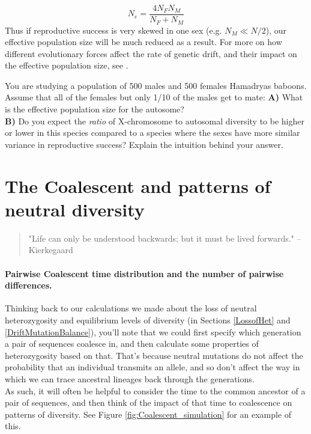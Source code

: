 \begin{equation}
N_e = \frac{4N_FN_M}{N_F+N_M}
\end{equation}
Thus if reproductive success is very skewed in one sex (e.g. $N_M \ll
N/2$), our effective population size will be much reduced as a result. For more on how different evolutionary forces affect the rate of genetic drift, and their impact on the effective population size, see \citet{charlesworth:09}.\\

\begin{question}
You are studying a population of 500 males and 500 females Hamadryas baboons. Assume that all of the females but only 1/10 of the males get to mate: 
{\bf A)} What is the effective population size for the autosome?\\
{\bf B)} Do you expect the {\it ratio} of X-chromosome to autosomal diversity to be higher or lower in this species compared to a species where the sexes have more similar variance in reproductive success? Explain the intuition behind your answer.
 \end{question}

\section{The Coalescent and patterns of neutral diversity}

\begin{quote}
"Life can only be understood backwards; but it must be lived
forwards." -- Kierkegaard
\end{quote}

\paragraph{Pairwise Coalescent time distribution and the number of
 pairwise differences.}
Thinking back to our calculations we made about the loss of neutral heterozygosity
and equilibrium levels of diversity (in Sections \ref{LossofHet} and \ref{DriftMutationBalance}), you'll note that we could first specify
which generation a pair of sequences coalesce in, and then calculate
some properties of heterozygosity based on that. That's because neutral
mutations do not affect the probability that an individual transmits
an allele, and so don't affect the way in which we can trace ancestral lineages
back through the generations. \\


As such, it will often be helpful to consider the time to the common
ancestor of a pair of sequences, and then think of the impact of that time to coalescence
on patterns of diversity. See Figure \ref{fig:Coalescent_simulation}
for an example of this. 

